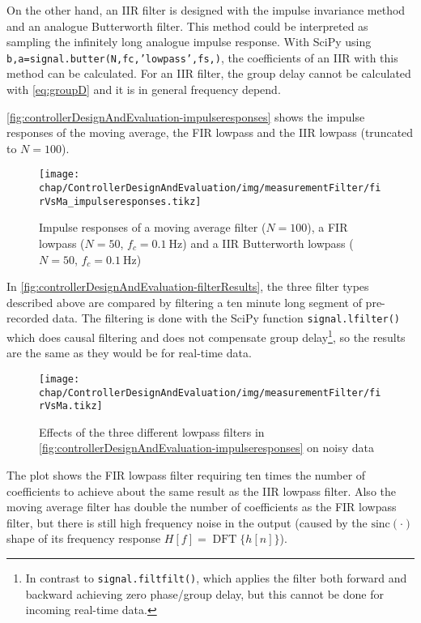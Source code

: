 On the other hand, an IIR filter is designed with the impulse invariance method and an analogue Butterworth filter.
This method could be interpreted as sampling the infinitely long analogue impulse response.\cite[p.~497]{Oppenheim2010}
With SciPy using \texttt{b,a=signal.butter(N,fc,'lowpass',fs,)}, the coefficients of an IIR with this method can be calculated.
For an IIR filter, the group delay cannot be calculated with \autoref{eq:groupD} and it is in general frequency depend.

\autoref{fig:controllerDesignAndEvaluation-impulseresponses} shows the impulse responses of the moving average, the FIR lowpass and the IIR lowpass (truncated to $N=100$).

\begin{figure}[tb]
	\centering
	\texttt{[image: chap/ControllerDesignAndEvaluation/img/measurementFilter/firVsMa\_impulseresponses.tikz]}
	\caption{Impulse responses of a moving average filter ($N=100$), a FIR lowpass ($N=50$, $f_c=\SI{0.1}{\hertz}$) and a IIR Butterworth lowpass ($N=50$, $f_c=\SI{0.1}{\hertz}$)}
	\label{fig:controllerDesignAndEvaluation-impulseresponses}
\end{figure}

In \autoref{fig:controllerDesignAndEvaluation-filterResults}, the three filter types described above are compared by filtering a ten minute long segment of pre-recorded data. The filtering is done with the SciPy function \texttt{signal.lfilter()} which does causal filtering and does not compensate group delay\footnote{In contrast to \texttt{signal.filtfilt()}, which applies the filter both forward and backward achieving zero phase/group delay, but this cannot be done for incoming real-time data.}, so the results are the same as they would be for real-time data.

\begin{figure}[tb]
	\centering
	\texttt{[image: chap/ControllerDesignAndEvaluation/img/measurementFilter/firVsMa.tikz]}
	\caption{Effects of the three different lowpass filters in \autoref{fig:controllerDesignAndEvaluation-impulseresponses} on noisy data}
	\label{fig:controllerDesignAndEvaluation-filterResults}
\end{figure}

The plot shows the FIR lowpass filter requiring ten times the number of coefficients to achieve about the same result as the IIR lowpass filter.
Also the moving average filter has double the number of coefficients as the FIR lowpass filter, but there is still high frequency noise in the output (caused by the $\text{sinc}(\cdot)$ shape of its frequency response $H[f]=\operatorname{DFT}\{h[n]\}$).

